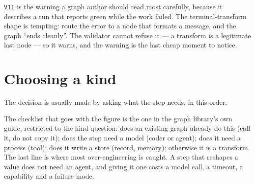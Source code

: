 \texttt{V11} is the warning a graph author should read most carefully, because it describes a run
that reports green while the work failed. The terminal-transform shape is tempting: route the error
to a node that formats a message, and the graph \enquote{ends cleanly}. The validator cannot refuse
it --- a transform is a legitimate last node --- so it warns, and the warning is the last cheap
moment to notice.

\section{Choosing a kind}

The decision is usually made by asking what the step needs, in this order.

\begin{center}
\end{center}

The checklist that goes with the figure is the one in the graph library's own guide, restricted to
the kind question: does an existing graph already do this (call it, do not copy it); does the step
need a model (coder or agent); does it need a process (tool); does it write a store (record,
memory); otherwise it is a transform. The last line is where most over-engineering is caught. A step
that reshapes a value does not need an agent, and giving it one costs a model call, a timeout, a
capability and a failure mode.

